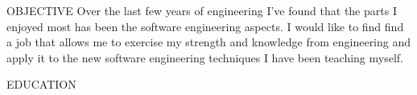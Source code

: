 \documentclass{resume} %
\begin{document}

\begin{newSection}{OBJECTIVE}
Over the last few years of engineering I've found that the parts I enjoyed most has been the software engineering aspects. I would like to find find a job that allows me to exercise my strength and knowledge from engineering and apply it to the new software engineering techniques I have been teaching myself.
\end{newSection}

\begin{newSection}{EDUCATION}
{}
\end{newSection}
\end{document}
